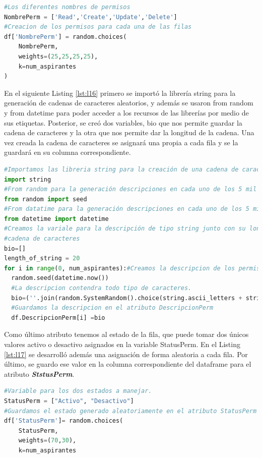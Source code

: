 \documentclass[10pt, oneside,spanish]{article}   	%
\begin{document}
\begin{lstlisting}[language=Python,label={lst:l15},caption=Atributo NombrePerm para la entidad Permisos,frame=single, ]
#Los diferentes nombres de permisos
NombrePerm = ['Read','Create','Update','Delete']
#Creacion de los permisos para cada una de las filas
df['NombrePerm'] = random.choices(
    NombrePerm, 
    weights=(25,25,25,25), 
    k=num_aspirantes
)
\end{lstlisting}
En el siguiente Listing \ref{lst:l16} primero se importó la librería string para la generación de cadenas de caracteres aleatorios, y además se usaron from random y from datetime para poder acceder a los recursos de las librerías por medio de sus etiquetas. Posterior, se creó dos variables, bio que nos permite guardar la cadena de caracteres y la otra que nos permite dar la longitud de la cadena. Una vez creada la cadena de caracteres se asignará una propia a cada fila y se la guardará en su columna correspondiente. 
\begin{lstlisting}[language=Python,label={lst:l16},caption=Atributo DescripcionPerm para la entidad Permisos,frame=single, ]
#Importamos las libreria string para la creación de una cadena de caracteres que representan texto
import string
#From random para la generación descripciones en cada uno de los 5 mil datos.
from random import seed
#From datatime para la generación descripciones en cada uno de los 5 mil datos.
from datetime import datetime
#Creamos la variale para la descripción de tipo string junto con su longitud de 
#cadena de caracteres
bio=[]
length_of_string = 20
for i in range(0, num_aspirantes):#Creamos la descripcion de los permisos
  random.seed(datetime.now())
  #La descripcion contendra todo tipo de caracteres.
  bio=(''.join(random.SystemRandom().choice(string.ascii_letters + string.digits) for i in range(length_of_string)))
  #Guardamos la descripcion en el atributo DescripcionPerm
  df.DescripcionPerm[i] =bio
\end{lstlisting}
Como último atributo tenemos al estado de la fila, que puede tomar dos únicos valores activo o desactivo asignados en la variable StatusPerm. En el Listing \ref{lst:l17} se desarrolló además una asignación de forma aleatoria a cada fila. Por último, se guardo ese valor en la columna correspondiente del dataframe para el atributo \textbf{\textit{StstusPerm}}.
\begin{lstlisting}[language=Python,label={lst:l17},caption=Atributo StatusPerm para la entidad Permisos,frame=single, ]
#Variable para los dos estados a manejar.
StatusPerm = ["Activo", "Desactivo"]
#Guardamos el estado generado aleatoriamente en el atributo StatusPerm
df['StatusPerm']= random.choices(
    StatusPerm, 
    weights=(70,30), 
    k=num_aspirantes

\end{lstlisting}
\end{document}
